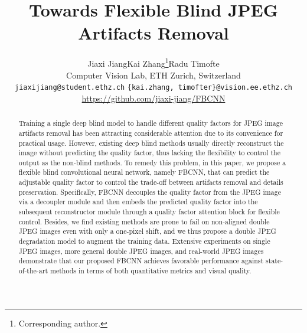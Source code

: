 \documentclass[10pt,twocolumn,letterpaper]{article}
\begin{document}
\title{Towards Flexible Blind JPEG Artifacts Removal}

\author{Jiaxi Jiang\qquad\quad Kai Zhang\thanks{Corresponding author.}\qquad\quad  Radu Timofte\vspace{0.1cm}\\
Computer Vision Lab, ETH Zurich, Switzerland\\
{\tt\small jiaxijiang@student.ethz.ch}\qquad
{\tt\small \{kai.zhang, timofter\}@vision.ee.ethz.ch}\\
\url{https://github.com/jiaxi-jiang/FBCNN}
}

\maketitle
\ificcvfinal\thispagestyle{empty}\fi





\begin{abstract}
Training a single deep blind model to handle different quality factors for JPEG image artifacts removal has been attracting considerable attention due to its convenience for practical usage. However, existing deep blind methods usually directly reconstruct the image without predicting the quality factor, thus lacking the flexibility to control the output as the non-blind methods. To remedy this problem, in this paper, we propose a flexible blind convolutional neural network, namely FBCNN, that can predict the adjustable quality factor to control the trade-off between artifacts removal and details preservation. Specifically, FBCNN decouples the quality factor from the JPEG image via a decoupler module and then embeds the predicted quality factor into the subsequent reconstructor module through a quality factor attention block for flexible control. Besides, we find existing methods are prone to fail on non-aligned double JPEG images even with only a one-pixel shift, and we thus propose a double JPEG degradation model to augment the training data. Extensive experiments on single JPEG images, more general double JPEG images, and real-world JPEG images demonstrate that our proposed FBCNN achieves favorable performance against state-of-the-art methods in terms of both quantitative metrics and visual quality.
\end{abstract}
\end{document}
